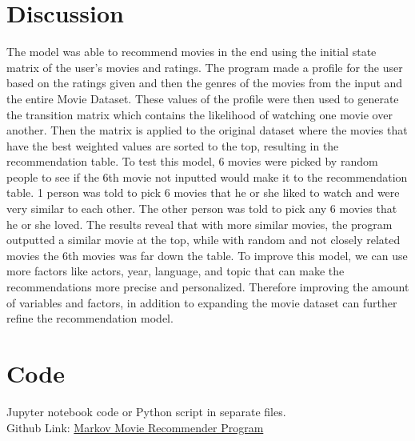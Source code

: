 \documentclass{article}
\begin{document}
\section{Discussion}
The model was able to recommend movies in the end using the initial state matrix of the user's movies and ratings. The program made a profile for the user
based on the ratings given and then the genres of the movies from the input and the entire Movie Dataset. These values of the profile were then used to generate
the transition matrix which contains the likelihood of watching one movie over another. Then the matrix is applied to the original dataset where the movies that have
the best weighted values are sorted to the top, resulting in the recommendation table. To test this model, 6 movies were picked by random people to see if the 6th movie not
inputted would make it to the recommendation table. 1 person was told to pick 6 movies that he or she liked to watch and were very similar to each other. The other
person was told to pick any 6 movies that he or she loved. The results reveal that with more similar movies, the program outputted a similar movie at the top, while
with random and not closely related movies the 6th movies was far down the table. To improve this model, we can use more factors like actors, year, language, and topic that can 
make the recommendations more precise and personalized. Therefore improving the amount of variables and factors, in addition to expanding the movie dataset can further refine the
recommendation model.

\section{Code}

Jupyter notebook code or Python script in separate files.\\
Github Link: \href{https://github.com/ishaansathaye/LinAlg-MultivarCalc/blob/main/MarkovProject/MarkovRecommendation/MovieRecommender.ipynb}{Markov Movie Recommender Program}
\end{document}
